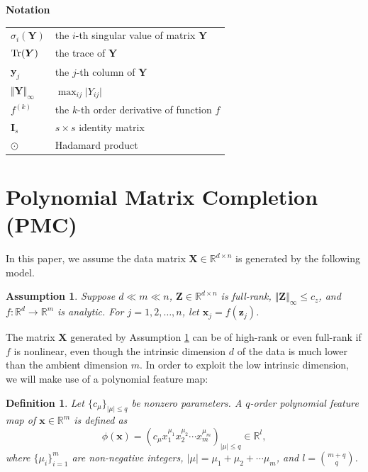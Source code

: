 \documentclass[letterpaper]{article} %
\newtheorem{assumption}{Assumption}
\newtheorem{definition}{Definition}
\begin{document}
\textbf{Notation}
\begin{table}[h!]
\centering
\begin{tabular}{ll}
\hline
$\sigma_i(\bm{Y})$ &the $i$-th singular value of matrix $\bm{Y}$ \\
$\textup{Tr}(\bm{Y})$ & the trace of $\bm{Y}$\\
$\bm{y}_j$ &the $j$-th column of $\bm{Y}$ \\
$\Vert\bm{Y}\Vert_\infty$ &$\max_{ij}\vert Y_{ij}\vert$\\
$f^{(k)}$& the $k$-th order derivative of function $f$\\
$\bm{I}_s$& $s\times s$ identity matrix\\
$\odot$	&Hadamard product \\
\hline
\end{tabular}
\end{table}

 



\section{Polynomial Matrix Completion (PMC)}
In this paper, we assume the data matrix $\bm{X} \in \mathbb{R}^{d\times n}$
is generated by the following model.
\begin{assumption}\label{asp_fz_analytic}
Suppose $d\ll m\ll n$, $\bm{Z}\in\mathbb{R}^{d\times n}$ is full-rank, $\Vert \bm{Z}\Vert_\infty\leq c_z$, and $f:\mathbb{R}^d\rightarrow\mathbb{R}^m$ is analytic. For $j=1,2,\ldots,n$, let $\bm{x}_j=f(\bm{z}_j)$.
\end{assumption}
The matrix $\bm{X}$ generated by Assumption \ref{asp_fz_analytic}
can be of high-rank or even full-rank if $f$ is nonlinear,
even though the intrinsic dimension $d$ of the data is much lower than the ambient dimension $m$.
In order to exploit the low intrinsic dimension,
we will make use of a polynomial feature map:
\begin{definition}\label{def_phi}
Let $\lbrace c_\mu\rbrace_{\vert\mu\vert\leq q}$ be nonzero parameters. A $q$-order polynomial feature map of $\bm{x}\in\mathbb{R}^m$ is defined as
$$\phi(\bm{x})=(c_{\mu}x_1^{\mu_1}x_2^{\mu_2}\cdots x_m^{\mu_m})_{\vert\mu\vert\leq q}\in\mathbb{R}^l,$$
where $\lbrace\mu_i\rbrace_{i=1}^m$ are non-negative integers, $\vert\mu\vert=\mu_1+\mu_2+\cdots\mu_m$, and $l=\binom{m+q}{q}$.
\end{definition}
\end{document}
